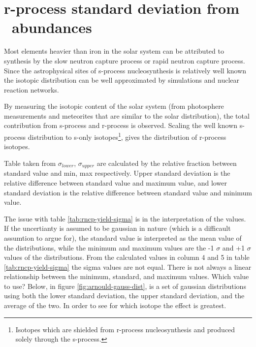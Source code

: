 \section{r-process standard deviation from \sos\ abundances}
Most elements heavier than iron in the solar system can be attributed to synthesis by the slow neutron capture process or rapid neutron capture process. Since the astrophysical sites of s-process nucleosynthesis is relatively well known the isotopic distribution can be well approximated by simulations and nuclear reaction networks.

By measuring the isotopic content of the solar system (from photosphere measurements and meteorites that are similar to the solar distribution), the total contribution from s-process and r-process is observed. Scaling the well known s-process distribution to s-only isotopes\footnote{Isotopes which are shielded from r-process nucleosynthesis and produced solely through the s-process.}, gives the distribution of r-process isotopes.

\begin{table}
  
  \caption[Observed r-process abundances in \sos\ ()]{\label{tab:rncp-yield-sigma}
    Table taken from 
    $\sigma_{lower}$, $\sigma_{upper}$ are calculated by the relative fraction between standard value and min, max respectively.
    Upper standard deviation is the relative difference between standard value and maximum value, and lower standard deviation is the relative difference between standard value and minimum value.
  }
\end{table}
\FloatBarrier

The issue with table \ref{tab:rncp-yield-sigma} is in the interpretation of the values. If the uncertianty is assumed to be gaussian in nature (which is a difficault assumtion to argue for), the standard value is interpreted as the mean value of the distributions, while the minimum and maximum values are the -1 $\sigma$ and +1 $\sigma$ values of the distributions. From the calculated values in column 4 and 5 in table \ref{tab:rncp-yield-sigma} the sigma values are not equal. There is not always a linear relationship between the minimum, standard, and maximum values.
Which value to use? Below, in figure \ref{fig:arnould-gauss-dist}, is a set of gaussian distributions using both  the lower standard deviation, the upper standard deviation, and the average of the two.
In order to see for which isotope the effect is greatest.

